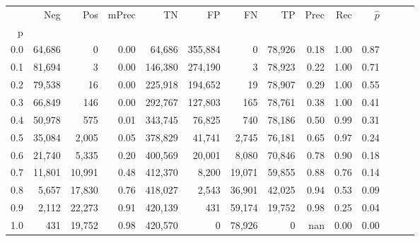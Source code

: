\begin{tabular}{rrrrrrrrrrrrrr}
\toprule
{} &     Neg &     Pos & mPrec &       TN &       FP &      FN &      TP &  Prec &   Rec & $\hat{p}$ \\
p   &         &         &       &          &          &         &         &       &       &           \\
\midrule
0.0 &  64,686 &       0 &  0.00 &   64,686 &  355,884 &       0 &  78,926 &  0.18 &  1.00 &      0.87 \\
0.1 &  81,694 &       3 &  0.00 &  146,380 &  274,190 &       3 &  78,923 &  0.22 &  1.00 &      0.71 \\
0.2 &  79,538 &      16 &  0.00 &  225,918 &  194,652 &      19 &  78,907 &  0.29 &  1.00 &      0.55 \\
0.3 &  66,849 &     146 &  0.00 &  292,767 &  127,803 &     165 &  78,761 &  0.38 &  1.00 &      0.41 \\
0.4 &  50,978 &     575 &  0.01 &  343,745 &   76,825 &     740 &  78,186 &  0.50 &  0.99 &      0.31 \\
0.5 &  35,084 &   2,005 &  0.05 &  378,829 &   41,741 &   2,745 &  76,181 &  0.65 &  0.97 &      0.24 \\
0.6 &  21,740 &   5,335 &  0.20 &  400,569 &   20,001 &   8,080 &  70,846 &  0.78 &  0.90 &      0.18 \\
0.7 &  11,801 &  10,991 &  0.48 &  412,370 &    8,200 &  19,071 &  59,855 &  0.88 &  0.76 &      0.14 \\
0.8 &   5,657 &  17,830 &  0.76 &  418,027 &    2,543 &  36,901 &  42,025 &  0.94 &  0.53 &      0.09 \\
0.9 &   2,112 &  22,273 &  0.91 &  420,139 &      431 &  59,174 &  19,752 &  0.98 &  0.25 &      0.04 \\
1.0 &     431 &  19,752 &  0.98 &  420,570 &        0 &  78,926 &       0 &   nan &  0.00 &      0.00 \\
\bottomrule
\end{tabular}

